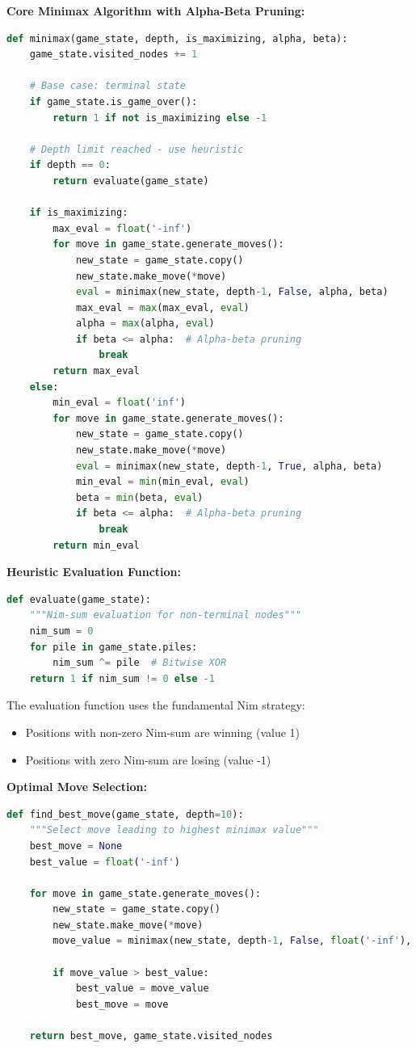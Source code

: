 \documentclass[12pt]{article}
\begin{document}
\textbf{Core Minimax Algorithm with Alpha-Beta Pruning:}

\begin{lstlisting}[language=Python, basicstyle=\small]
def minimax(game_state, depth, is_maximizing, alpha, beta):
    game_state.visited_nodes += 1
    
    # Base case: terminal state
    if game_state.is_game_over():
        return 1 if not is_maximizing else -1
    
    # Depth limit reached - use heuristic
    if depth == 0:
        return evaluate(game_state)
    
    if is_maximizing:
        max_eval = float('-inf')
        for move in game_state.generate_moves():
            new_state = game_state.copy()
            new_state.make_move(*move)
            eval = minimax(new_state, depth-1, False, alpha, beta)
            max_eval = max(max_eval, eval)
            alpha = max(alpha, eval)
            if beta <= alpha:  # Alpha-beta pruning
                break
        return max_eval
    else:
        min_eval = float('inf')
        for move in game_state.generate_moves():
            new_state = game_state.copy()
            new_state.make_move(*move)
            eval = minimax(new_state, depth-1, True, alpha, beta)
            min_eval = min(min_eval, eval)
            beta = min(beta, eval)
            if beta <= alpha:  # Alpha-beta pruning
                break
        return min_eval
\end{lstlisting}

\textbf{Heuristic Evaluation Function:}

\begin{lstlisting}[language=Python, basicstyle=\small]
def evaluate(game_state):
    """Nim-sum evaluation for non-terminal nodes"""
    nim_sum = 0
    for pile in game_state.piles:
        nim_sum ^= pile  # Bitwise XOR
    return 1 if nim_sum != 0 else -1
\end{lstlisting}

The evaluation function uses the fundamental Nim strategy:
\begin{itemize}
    \item Positions with non-zero Nim-sum are winning (value 1)
    \item Positions with zero Nim-sum are losing (value -1)
\end{itemize}

\textbf{Optimal Move Selection:}

\begin{lstlisting}[language=Python, basicstyle=\small]
def find_best_move(game_state, depth=10):
    """Select move leading to highest minimax value"""
    best_move = None
    best_value = float('-inf')
    
    for move in game_state.generate_moves():
        new_state = game_state.copy()
        new_state.make_move(*move)
        move_value = minimax(new_state, depth-1, False, float('-inf'), float('inf'))
        
        if move_value > best_value:
            best_value = move_value
            best_move = move
    
    return best_move, game_state.visited_nodes
\end{lstlisting}
\end{document}
